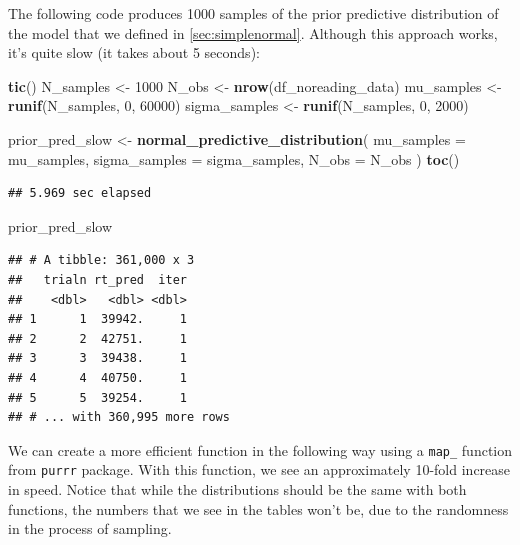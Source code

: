\documentclass[12pt,]{krantz}
\newenvironment{Shaded}{\begin{snugshade}}{\end{snugshade}}
\newcommand{\DataTypeTok}[1]{\textcolor[rgb]{0.13,0.29,0.53}{#1}}
\newcommand{\DecValTok}[1]{\textcolor[rgb]{0.00,0.00,0.81}{#1}}
\newcommand{\KeywordTok}[1]{\textcolor[rgb]{0.13,0.29,0.53}{\textbf{#1}}}
\newcommand{\NormalTok}[1]{#1}
\newcommand{\StringTok}[1]{\textcolor[rgb]{0.31,0.60,0.02}{#1}}
\theoremstyle{definition}
\theoremstyle{definition}
\theoremstyle{definition}
\theoremstyle{remark}
\begin{document}
The following code produces 1000 samples of the prior predictive distribution of the model that we defined in \ref{sec:simplenormal}. Although this approach works, it's quite slow (it takes about 5 seconds):

\begin{Shaded}
\begin{Highlighting}[]
\KeywordTok{tic}\NormalTok{()}
\NormalTok{N_samples <-}\StringTok{ }\DecValTok{1000}
\NormalTok{N_obs <-}\StringTok{ }\KeywordTok{nrow}\NormalTok{(df_noreading_data)}
\NormalTok{mu_samples <-}\StringTok{ }\KeywordTok{runif}\NormalTok{(N_samples, }\DecValTok{0}\NormalTok{, }\DecValTok{60000}\NormalTok{)}
\NormalTok{sigma_samples <-}\StringTok{ }\KeywordTok{runif}\NormalTok{(N_samples, }\DecValTok{0}\NormalTok{, }\DecValTok{2000}\NormalTok{)}

\NormalTok{prior_pred_slow <-}\StringTok{ }\KeywordTok{normal_predictive_distribution}\NormalTok{(}
  \DataTypeTok{mu_samples =}\NormalTok{ mu_samples,}
  \DataTypeTok{sigma_samples =}\NormalTok{ sigma_samples,}
  \DataTypeTok{N_obs =}\NormalTok{ N_obs}
\NormalTok{)}
\KeywordTok{toc}\NormalTok{()}
\end{Highlighting}
\end{Shaded}

\begin{verbatim}
## 5.969 sec elapsed
\end{verbatim}

\begin{Shaded}
\begin{Highlighting}[]
\NormalTok{prior_pred_slow}
\end{Highlighting}
\end{Shaded}

\begin{verbatim}
## # A tibble: 361,000 x 3
##   trialn rt_pred  iter
##    <dbl>   <dbl> <dbl>
## 1      1  39942.     1
## 2      2  42751.     1
## 3      3  39438.     1
## 4      4  40750.     1
## 5      5  39254.     1
## # ... with 360,995 more rows
\end{verbatim}

We can create a more efficient function in the following way using a \texttt{map\_} function from \texttt{purrr} package. With this function, we see an approximately 10-fold increase in speed. Notice that while the distributions should be the same with both functions, the numbers that we see in the tables won't be, due to the randomness in the process of sampling.
\end{document}
